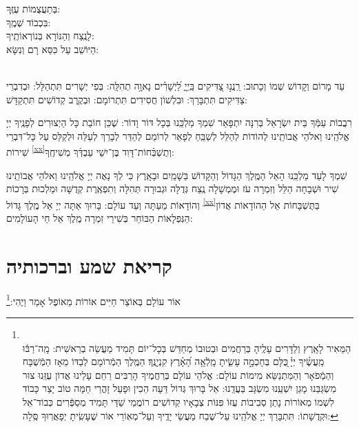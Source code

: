\documentclass[twoside, openany, parskip=half, 11pt]{book}
\begin{document}

 בְּתַעֲצֻמוֹת עֻזֶּֽךָ:\\
 בִּכְבוֹד שְׁמֶֽךָ:\\ 
 לָנֶֽצַח וְהַנּוֹרָא בְּנוֹרְאוֹתֶֽיךָ:\\
 הַיּוֹשֵׁב עַל כִּסֵּא רָם וְנִשָּׂא:

\\
 עַד מָרוֹם וְקָדוֹשׁ שְׁמוֹ וְכָתוּב: רַֽנֲנ֣וּ צַ֭דִּיקִים בַּֽיְיָ֑ לַ֝יְשָׁרִ֗ים נָאוָ֥ה תְהִלָּֽה: בְּפִי יְשָׁרִים תִּתְהַלָּל:  וּבְדִבְרֵי צַדִּיקִים תִּתְבָּרַךְ: וּבִלְשׁוֹן חֲסִידִים תִּתְרוֹמָם: וּבְקֶֽרֶב קְדוֹשִׁים תִּתְקַדָּשׁ:
 
  רִבֲבוֹת עַמְּֿךָ בֵּית יִשְׂרָאֵל בְּרִנָּה יִתְפָּאַר שִׁמְךָ מַלְכֵּֽנוּ בְּכָל דּוֹר וָדוֹר: שֶׁכֵּן חוֹבַת כָּל הַיְצוּרִים לְפָנֶֽיךָ יְיָ אֱלֹהֵֽינוּ וֵאלֹהֵי אֲבוֹתֵֽינוּ לְהוֹדוֹת לְהַלֵּל לְשַׁבֵּֽחַ לְפָאֵר לְרוֹמֵם לְהַדֵּר לְבָרֵךְ לְעַלֵּה וּלְקַלֵּס עַל כָּל־דִּבְרֵי שִׁירוֹת \textsuperscript{\ref{xx}}וְתֻשְׁבְּֿחוֹת־דָּוִד בֶּן־יִשַׁי עַבְדְּֿךָ מְשִׁיחֶֽךָ:


 שִׁמְךָ לָעַד מַלְכֵּֽנוּ הָאֵל הַמֶּֽלֶךְ הַגָּדוֹל וְהַקָּדוֹשׁ בַּשָׁמַֽיִם וּבָאָֽרֶץ כִּי לְךָ נָאֶה יְיָ אֱלֹהֵֽינוּ וֵאלֹהֵי אֲבוֹתֵֽינוּ שִׁיר וּשְׁבָחָה הַלֵּל וְזִמְרָה עֹז וּמֶמְשָׁלָה נֶֽצַח גְּדֻלָּה וּגְבוּרָה תְּהִלָּה וְתִפְאֶֽרֶת קְדֻשָּׁה וּמַלְכוּת בְּרָכוֹת וְהוֹדָאוֹת מֵעַתָּה וְעַד עוֹלָם:
 בָּרוּךְ אַתָּה יְיָ אֵל מֶֽלֶךְ גָּדוֹל \textsuperscript{\ref{xx}}בַּתֻּשְׁבָּחוֹת אֵל הַהוֹדָאוֹת אֲדוֹן הַנִּפְלָאוֹת הַבּוֹחֵר בְּשִׁירֵי זִמְרָה מֶֽלֶךְ אֵל חַי הָעוֹלָמִים:

\halfkaddish

\section*{ קריאת שמע וברכותיה }

\barachu


אוֹר עוֹלָם בְּאוֹצַר חַיִּים אוֹרוֹת מֵאוֹפֶל אָמַר וַיֶהִי:\footnote{\\
הַמֵּאִיר לָאָֽרֶץ וְלַדָּרִים עָלֶֽיהָ בְּרַחֲמִים וּבְטוּבוֹ מְחַדֵּשׁ בְּכָל־יוֹם תָּמִיד מַעֲשֵׂה בְרֵאשִׁית: 
 מָֽה־רַבּ֬וּ מַֽעֲשֶׂ֨יךָ יְיָ֗ ֖כֻּלָּם בְּחָכְמָ֣ה עָשִׂ֑יתָ מָֽלְֿאָ֥ה הָ֝אָ֗רֶץ קִנְיָנֶֽךָ׃ הַמֶּֽלֶךְ הַמְֿרוֹמָם לְבַדּוֹ מֵאָז הַמְֿשֻׁבָּח וְהַמְֿפֹאָר וְהַמִּתְנַשֵּׂא מִימוֹת עוֹלָם: אֱלֹהֵי עוֹלָם בְּרַחֲמֶיךָ הָרַבִּים רַחֵם עָלֵינוּ אֲדוֹן עֻזֵּֽנוּ צוּר מִשְׂגַּבֵּנוּ מָגֵן יִשְׁעֵֽנוּ מִשְׂגָּב בַּעֲדֵֽנוּ: אֵל בָּרוּךְ גְּדוֹל דֵּעָה הֵכִין וּפָעַל זָהֳרֵי חַמָּה טוֹב יָצַר כָּבוֹד לִשְׁמוֹ מְאוֹרוֹת נָתַן סְבִיבוֹת עֻזּוֹ פִּנּוֹת צְבָאָיו קְדוֹשִׁים רוֹמֲמֵי שַׁדַּי תָּמִיד מְסַפְּֿרִים כְּבוֹד־אֵל וּקְדֻשָׁתוֹ: תִּתְבָּרַךְ יְיָ אֱלֹהֵֽינוּ עַל־שֶׁבַח מַעֲשֵׂי יָדֶֽיךָ וְעַל־מְאֽוֹרֵי אוֹר שֶׁעָשִֽׂיתָ יְפָאֲרֽוּךָ סֶּֽלָה: 
}
\end{document}
